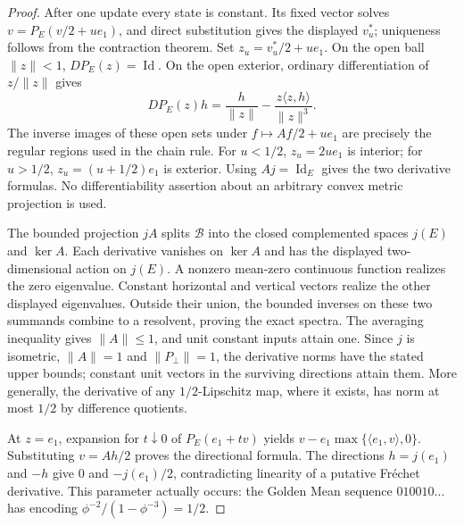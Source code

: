 \begin{proof}
After one update every state is constant. Its fixed vector solves
$v=P_E(v/2+ue_1)$, and direct substitution gives the displayed $v_u^*$;
uniqueness follows from the contraction theorem. Set $z_u=v_u^*/2+ue_1$.
On the open ball $\|z\|<1$, $DP_E(z)=\operatorname{Id}$. On the open exterior,
ordinary differentiation of $z/\|z\|$ gives
\[
 DP_E(z)h=\frac{h}{\|z\|}
       -\frac{z\langle z,h\rangle}{\|z\|^3}.
\]
The inverse images of these open sets under $f\mapsto Af/2+ue_1$
are precisely the regular regions used in the chain rule. For $u<1/2$,
$z_u=2ue_1$ is interior; for $u>1/2$, $z_u=(u+1/2)e_1$ is exterior.
Using $Aj=\operatorname{Id}_E$ gives the two derivative formulas. No
differentiability assertion about an arbitrary convex metric projection is used.

The bounded projection $jA$ splits $\mathcal B$ into the closed complemented
spaces $j(E)$ and $\ker A$. Each derivative vanishes on $\ker A$ and has the
displayed two-dimensional action on $j(E)$. A nonzero mean-zero continuous
function realizes the zero eigenvalue. Constant horizontal and vertical vectors
realize the other displayed eigenvalues. Outside their union, the bounded
inverses on these two summands combine to a resolvent, proving the exact spectra.
The averaging inequality gives $\|A\|\leq1$, and unit constant inputs attain one.
Since $j$ is isometric, $\|A\|=1$ and $\|P_\perp\|=1$, the derivative norms
have the stated upper bounds; constant unit vectors in the surviving directions
attain them. More generally, the derivative of any $1/2$-Lipschitz map,
where it exists, has norm at most $1/2$ by difference quotients.

At $z=e_1$, expansion for $t\downarrow0$ of $P_E(e_1+tv)$ yields
$v-e_1\max\{\langle e_1,v\rangle,0\}$. Substituting $v=Ah/2$ proves the
directional formula. The directions $h=j(e_1)$ and $-h$ give $0$ and
$-j(e_1)/2$, contradicting linearity of a putative Fr\'echet derivative.
This parameter actually occurs: the Golden Mean sequence $010010\ldots$
has encoding $\phi^{-2}/(1-\phi^{-3})=1/2$.
\end{proof}

